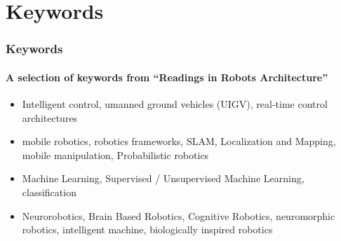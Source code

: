 \section{Keywords}

\begin{frame}
    \frametitle{Keywords}
    \framesubtitle{A selection of keywords from ``Readings in Robots Architecture''}
    \begin{itemize}
    	\item Intelligent control, umanned ground vehicles (UIGV), real-time control architectures
    	\item mobile robotics, robotics frameworks, SLAM, Localization and Mapping, mobile manipulation, Probabilistic robotics 
    	\item Machine Learning, Supervised / Unsupervised Machine Learning, classification
    	\item Neurorobotics, Brain Based Robotics, Cognitive Robotics, neuromorphic robotics, intelligent machine, biologically inspired robotics 
    \end{itemize}
\end{frame}